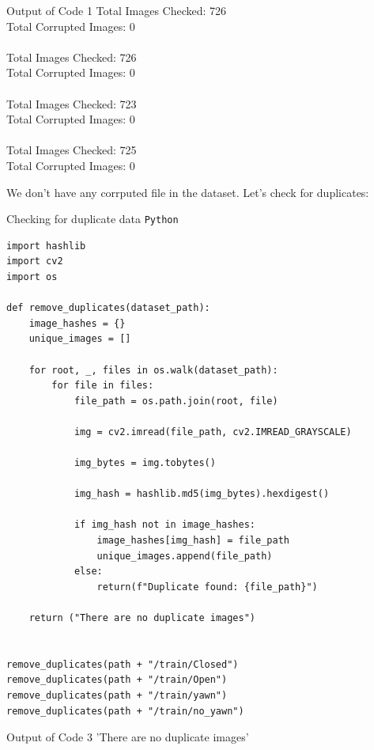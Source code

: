 \documentclass{modeleRapport}
\begin{document}
\begin{codebox}[OutputA]{ Output of Code 1}
Total Images Checked: 726\\
Total Corrupted Images: 0\\
\\
Total Images Checked: 726\\
Total Corrupted Images: 0\\
\\
Total Images Checked: 723\\
Total Corrupted Images: 0\\
\\
Total Images Checked: 725\\
Total Corrupted Images: 0\\
\end{codebox}

We don't have any corrputed file in the dataset. Let's check for duplicates:

\begin{codebox}{Checking for duplicate data \texttt{Python}}
\begin{lstlisting}
import hashlib
import cv2
import os

def remove_duplicates(dataset_path):
    image_hashes = {}
    unique_images = []

    for root, _, files in os.walk(dataset_path):  
        for file in files:
            file_path = os.path.join(root, file)  

            img = cv2.imread(file_path, cv2.IMREAD_GRAYSCALE)

            img_bytes = img.tobytes()

            img_hash = hashlib.md5(img_bytes).hexdigest()

            if img_hash not in image_hashes:
                image_hashes[img_hash] = file_path
                unique_images.append(file_path)
            else:
                return(f"Duplicate found: {file_path}")

    return ("There are no duplicate images")


remove_duplicates(path + "/train/Closed")
remove_duplicates(path + "/train/Open")
remove_duplicates(path + "/train/yawn")
remove_duplicates(path + "/train/no_yawn")
\end{lstlisting}
\end{codebox}

\begin{codebox}[OutputB]{ Output of Code 3}
'There are no duplicate images'
\end{codebox}
\end{document}
